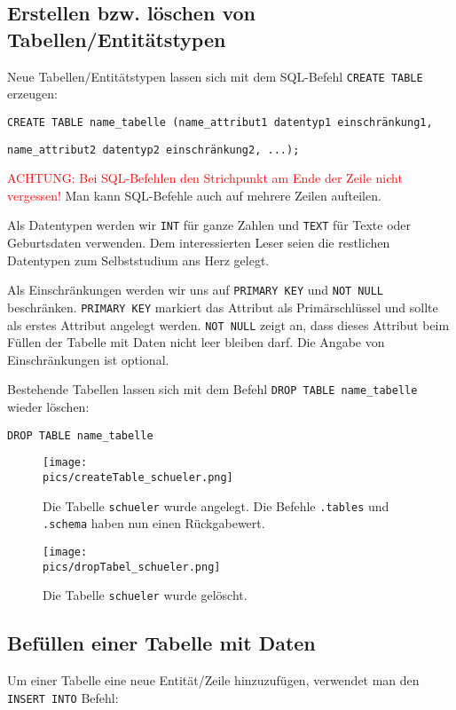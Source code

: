 \subsection{Erstellen bzw. löschen von Tabellen/Entitätstypen}
Neue Tabellen/Entitätstypen lassen sich mit dem SQL-Befehl \lstinline!CREATE TABLE! erzeugen:

\begin{tcolorbox}[title=Tabellen erstellen]
	\lstinline!CREATE TABLE name_tabelle (name_attribut1 datentyp1 einschränkung1,!

    \lstinline!name_attribut2 datentyp2 einschränkung2, ...);!
\end{tcolorbox}
\textcolor{red}{ACHTUNG: Bei SQL-Befehlen den Strichpunkt am Ende der Zeile nicht vergessen!} Man kann SQL-Befehle auch auf mehrere Zeilen aufteilen.

Als Datentypen werden wir \lstinline!INT! für ganze Zahlen und \lstinline!TEXT! für Texte oder Geburtsdaten verwenden. Dem interessierten Leser seien die restlichen Datentypen zum Selbststudium ans Herz gelegt.

Als Einschränkungen werden wir uns auf \lstinline!PRIMARY KEY! und \lstinline!NOT NULL! beschränken. \lstinline!PRIMARY KEY! markiert das Attribut als Primärschlüssel und sollte als erstes Attribut angelegt werden. \lstinline!NOT NULL! zeigt an, dass dieses Attribut beim Füllen der Tabelle mit Daten nicht leer bleiben darf. Die Angabe von Einschränkungen ist optional.

Bestehende Tabellen lassen sich mit dem Befehl \lstinline!DROP TABLE name_tabelle! wieder löschen:
\begin{tcolorbox}[title=Tabellen löschen]
	\lstinline[breaklines=true]!DROP TABLE name_tabelle !
\end{tcolorbox}
\begin{figure}[h]
	\centering
	\texttt{[image: \\pics/createTable\_schueler.png]}
	\caption*{Die Tabelle \lstinline!schueler! wurde angelegt. Die Befehle \lstinline!.tables! und \lstinline!.schema! haben nun einen Rückgabewert.}
\end{figure}
\begin{figure}[h]
	\centering
	\texttt{[image: \\pics/dropTabel\_schueler.png]}
	\caption*{Die Tabelle \lstinline!schueler! wurde gelöscht.}
\end{figure}

\subsection{Befüllen einer Tabelle mit Daten}
Um einer Tabelle eine neue Entität/Zeile hinzuzufügen, verwendet man den \lstinline!INSERT INTO! Befehl:

